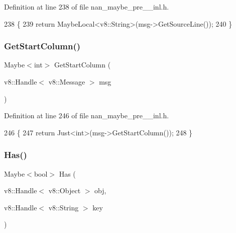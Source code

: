 Definition at line 238 of file nan\+\_\+maybe\+\_\+pre\+\_\+\_\+inl.\+h.


\begin{DoxyCode}
238                                                             \{
239   \textcolor{keywordflow}{return} MaybeLocal<v8::String>(msg->GetSourceLine());
240 \}
\end{DoxyCode}
\mbox{\label{nan__maybe__pre__43__inl_8h_aa2a6f3cc380952bc26a101e694b90cd8}} 
\subsubsection{Get\+Start\+Column()}
{\footnotesize\ttfamily Maybe$<$int$>$ Get\+Start\+Column (\begin{DoxyParamCaption}\item[{v8\+::\+Handle$<$ v8\+::\+Message $>$}]{msg }\end{DoxyParamCaption})}



Definition at line 246 of file nan\+\_\+maybe\+\_\+pre\+\_\+\_\+inl.\+h.


\begin{DoxyCode}
246                                                           \{
247   \textcolor{keywordflow}{return} Just<int>(msg->GetStartColumn());
248 \}
\end{DoxyCode}
\mbox{\label{nan__maybe__pre__43__inl_8h_a933222f602d5bd7efd7cd8c8f962c32e}} 
\subsubsection{Has()\hspace{0.1cm}{\footnotesize\ttfamily [1/2]}}
{\footnotesize\ttfamily Maybe$<$bool$>$ Has (\begin{DoxyParamCaption}\item[{v8\+::\+Handle$<$ v8\+::\+Object $>$}]{obj,  }\item[{v8\+::\+Handle$<$ v8\+::\+String $>$}]{key }\end{DoxyParamCaption})}




